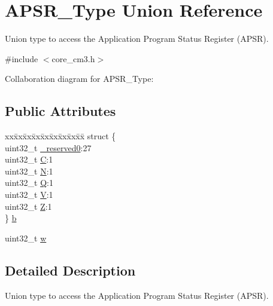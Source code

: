 \hypertarget{unionAPSR__Type}{}\section{A\+P\+S\+R\+\_\+\+Type Union Reference}
\label{unionAPSR__Type}


Union type to access the Application Program Status Register (A\+P\+SR).  




{\ttfamily \#include $<$core\+\_\+cm3.\+h$>$}



Collaboration diagram for A\+P\+S\+R\+\_\+\+Type\+:
\subsection*{Public Attributes}
\begin{DoxyCompactItemize}
\item 
\begin{tabbing}
xx\=xx\=xx\=xx\=xx\=xx\=xx\=xx\=xx\=\kill
struct \{\\
\>uint32\_t \hyperlink{unionAPSR__Type_afbce95646fd514c10aa85ec0a33db728}{\_reserved0}:27\\
\>uint32\_t \hyperlink{unionAPSR__Type_a86e2c5b891ecef1ab55b1edac0da79a6}{C}:1\\
\>uint32\_t \hyperlink{unionAPSR__Type_a7e7bbba9b00b0bb3283dc07f1abe37e0}{N}:1\\
\>uint32\_t \hyperlink{unionAPSR__Type_a22d10913489d24ab08bd83457daa88de}{Q}:1\\
\>uint32\_t \hyperlink{unionAPSR__Type_a8004d224aacb78ca37774c35f9156e7e}{V}:1\\
\>uint32\_t \hyperlink{unionAPSR__Type_a3b04d58738b66a28ff13f23d8b0ba7e5}{Z}:1\\
\} \hyperlink{unionAPSR__Type_a7dbc79a057ded4b11ca5323fc2d5ab14}{b}\\

\end{tabbing}\item 
uint32\+\_\+t \hyperlink{unionAPSR__Type_ae4c2ef8c9430d7b7bef5cbfbbaed3a94}{w}
\end{DoxyCompactItemize}


\subsection{Detailed Description}
Union type to access the Application Program Status Register (A\+P\+SR). 

